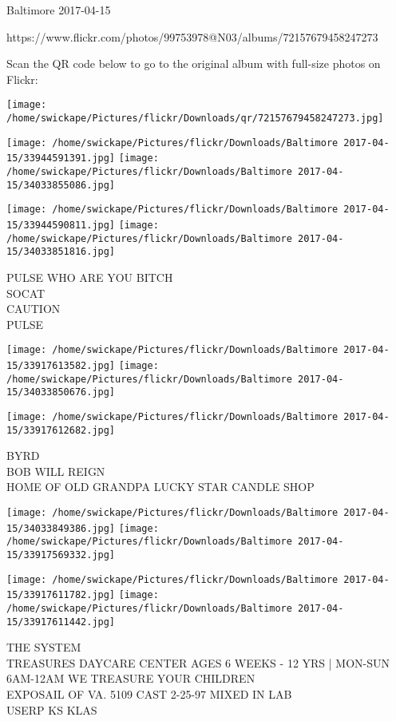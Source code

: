 \documentclass[10pt,letterpaper]{article}
\begin{document}
Baltimore 2017-04-15

https://www.flickr.com/photos/99753978@N03/albums/72157679458247273

Scan the QR code below to go to the original album with full-size photos on Flickr:

\texttt{[image: /home/swickape/Pictures/flickr/Downloads/qr/72157679458247273.jpg]}
\pagebreak

\texttt{[image: /home/swickape/Pictures/flickr/Downloads/Baltimore 2017-04-15/33944591391.jpg]}
\texttt{[image: /home/swickape/Pictures/flickr/Downloads/Baltimore 2017-04-15/34033855086.jpg]}

\texttt{[image: /home/swickape/Pictures/flickr/Downloads/Baltimore 2017-04-15/33944590811.jpg]}
\texttt{[image: /home/swickape/Pictures/flickr/Downloads/Baltimore 2017-04-15/34033851816.jpg]}

PULSE WHO ARE YOU BITCH\\
SOCAT\\
CAUTION\\
PULSE\\
\pagebreak

\texttt{[image: /home/swickape/Pictures/flickr/Downloads/Baltimore 2017-04-15/33917613582.jpg]}
\texttt{[image: /home/swickape/Pictures/flickr/Downloads/Baltimore 2017-04-15/34033850676.jpg]}

\vspace{0.25in}
\texttt{[image: /home/swickape/Pictures/flickr/Downloads/Baltimore 2017-04-15/33917612682.jpg]}

BYRD\\
BOB WILL REIGN\\
HOME OF OLD GRANDPA LUCKY STAR CANDLE SHOP\\
\pagebreak

\texttt{[image: /home/swickape/Pictures/flickr/Downloads/Baltimore 2017-04-15/34033849386.jpg]}
\texttt{[image: /home/swickape/Pictures/flickr/Downloads/Baltimore 2017-04-15/33917569332.jpg]}

\texttt{[image: /home/swickape/Pictures/flickr/Downloads/Baltimore 2017-04-15/33917611782.jpg]}
\texttt{[image: /home/swickape/Pictures/flickr/Downloads/Baltimore 2017-04-15/33917611442.jpg]}

THE SYSTEM\\
TREASURES DAYCARE CENTER AGES 6 WEEKS {-} 12 YRS | MON{-}SUN 6AM{-}12AM WE TREASURE YOUR CHILDREN\\
EXPOSAIL OF VA. 5109 CAST 2{-}25{-}97 MIXED IN LAB\\
USERP KS KLAS\\
\pagebreak
\end{document}
